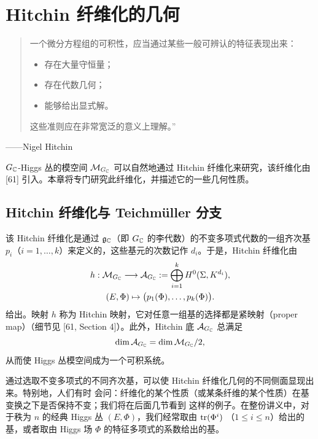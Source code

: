 \section{Hitchin 纤维化的几何}

\begin{quote}
\kaishu
一个微分方程组的可积性，应当通过某些一般可辨认的特征表现出来：
\begin{itemize}[label=$\star$,leftmargin=1.6em,itemsep=1pt,topsep=2pt]
\item 存在大量守恒量；
\item 存在代数几何；
\item 能够给出显式解。
\end{itemize}
这些准则应在非常宽泛的意义上理解。”
\end{quote}
\begin{flushright}
——Nigel Hitchin
\end{flushright}

$G_{\mathbb{C}}$-Higgs 丛的模空间 $\mathcal{M}_{G_{\mathbb{C}}}$ 可以自然地通过 Hitchin 纤维化来研究，该纤维化由
[61] 引入。本章将专门研究此纤维化，并描述它的一些几何性质。

\subsection{Hitchin 纤维化与 Teichmüller 分支}

该 Hitchin 纤维化是通过 $\mathfrak{g}_{\mathbb{C}}$（即 $G_{\mathbb{C}}$ 的李代数）的不变多项式代数的一组齐次基
$p_i$（$i=1,\dots,k$）来定义的，这些基元的次数记作 $d_i$。于是，Hitchin 纤维化由
\[
\begin{gathered}
h:\mathcal{M}_{G_{\mathbb{C}}}\longrightarrow\mathcal{A}_{G_{\mathbb{C}}}
 :=\bigoplus_{i=1}^{k}H^0(\Sigma,K^{d_i}),\\
(E,\Phi)\mapsto\big(p_1(\Phi),\dots,p_k(\Phi)\big).
\end{gathered}
\]
给出。映射 $h$ 称为 Hitchin 映射，它对任意一组基的选择都是紧映射（proper map）（细节见
[61, Section 4]）。此外，Hitchin 底 $\mathcal{A}_{G_{\mathbb{C}}}$ 总满足
\[
\dim\mathcal{A}_{G_{\mathbb{C}}}=\dim\mathcal{M}_{G_{\mathbb{C}}}/2,
\]
从而使 Higgs 丛模空间成为一个可积系统。

通过选取不变多项式的不同齐次基，可以使 Hitchin 纤维化几何的不同侧面显现出来。特别地，人们有时
会问：纤维化的某个性质（或某条纤维的某个性质）在基变换之下是否保持不变；我们将在后面几节看到
这样的例子。在整份讲义中，对于秩为 $n$ 的经典 Higgs 丛 $(E,\Phi)$，我们经常取由 $\operatorname{tr}(\Phi^i)$
（$1\leqslant i\leqslant n$）给出的基，或者取由 Higgs 场 $\Phi$ 的特征多项式的系数给出的基。

